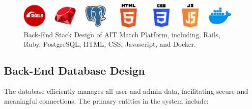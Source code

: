         \begin{figure}[h]
            \centering
            \captionsetup{justification=centering, singlelinecheck=false, labelsep=space}
            \includegraphics[width=6in]{figures/stack-design.png} %
            \caption{Back-End Stack Design of AIT Match Platform, including, Rails, Ruby, PostgreSQL, HTML, CSS, Javascript, and Docker.}
            \label{fig:stack}
        \end{figure}   
    \newpage
    \subsection{Back-End Database Design}
        The database efficiently manages all user and admin data, facilitating secure and meaningful connections. The primary entities in the system include:
        
